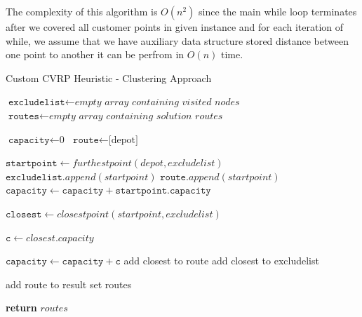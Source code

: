 \documentclass[12pt]{article}
\newcommand{\var}{\texttt}
\begin{document}
The complexity of this algorithm is $O(n^2)$ since the main while loop terminates after we covered all customer points in given instance and for each iteration of while, we assume that we have auxiliary data structure stored distance between one point to another it can be perfrom in $O(n)$ time.

\begin{algorithm}[hbt!]
	\caption{Custom CVRP Heuristic - Clustering Approach}
	\begin{algorithmic}[1]
	\State $\var{excludelist} \gets \textit{empty array containing visited nodes}$
	\State $\var{routes} \gets \textit{empty array containing solution routes}$
		
	\State $\var{capacity} \gets \text{0}$
	\State $\var{route} \gets \text{[depot]}$
	
	\State $\var{startpoint} \gets furthestpoint(depot, excludelist)$
	\State $\var{excludelist}.append(startpoint)$
	\State $\var{route}.append(startpoint)$
	\State $\var{capacity} \gets \var{capacity} + \var{startpoint.capacity}$

			\State $\var{closest} \gets closestpoint(startpoint, excludelist)$

			\State $\var{c} \gets closest.capacity$

			\If{$\var{c} + \var{capacity} > \var{max capacity}$}
			\EndIf

			\State $\var{capacity} \gets \var{capacity} + \var{c}$
			\State add closest to route
			\State add closest to excludelist

		\EndWhile
		\State add route to result set routes

	\EndWhile

	\State \textbf{return} $routes$
	\EndFunction
	\end{algorithmic}
\end{algorithm}
\end{document}
